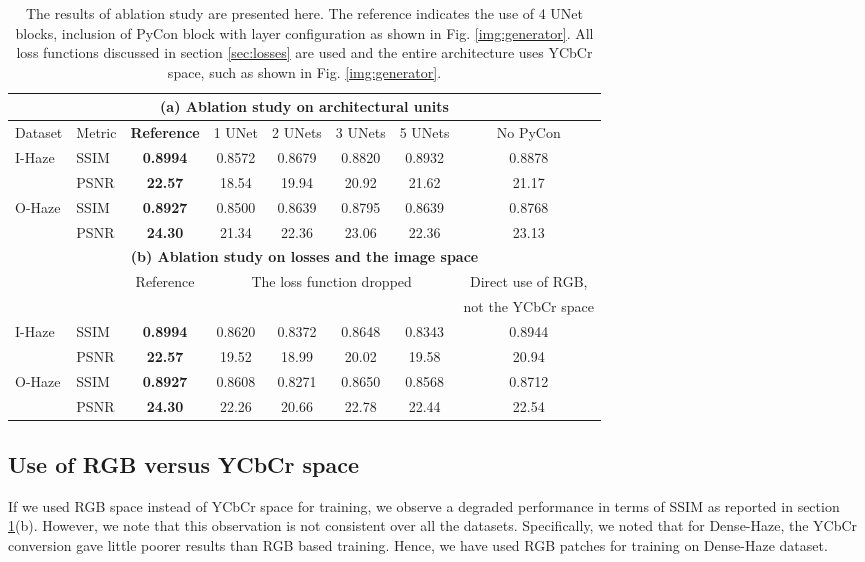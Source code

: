 \documentclass[runningheads]{llncs}
\begin{document}
\begin{table}[t]
\centering
\caption{The results of ablation study are presented here. The reference indicates the use of 4 UNet blocks, inclusion of PyCon block with layer configuration as shown in Fig. \ref{img:generator}. All loss functions discussed in section \ref{sec:losses} are used and the entire architecture uses YCbCr space, such as shown in Fig. \ref{img:generator}.}
\label{tab:abl1}
\begin{tabular}{|l|l||c|c|c|c|c|c|}
\hline
\multicolumn{8}{|c|}{\textbf{(a) Ablation study on architectural units}}\\
\hline
{Dataset}& {Metric}&\textbf{Reference}&{1 UNet}&{2 UNets}&{3 UNets}&{5 UNets} &{No PyCon}\\
\hline
\hline
I-Haze & SSIM & \textbf{0.8994} & 0.8572 & 0.8679 & 0.8820 & {0.8932} & {0.8878}\\
\cline{2-8}
& PSNR & \textbf{22.57} & 18.54 & 19.94 & 20.92 & {21.62} & 21.17 \\
\hline
O-Haze & SSIM & \textbf{0.8927} & 0.8500 & 0.8639 & 0.8795 & {0.8639} & {0.8768}\\
\cline{2-8}
& PSNR & \textbf{24.30} & 21.34 & 22.36 & 23.06 & {22.36} & 23.13 \\
\hline
\hline
\multicolumn{8}{|c|}{\textbf {(b) Ablation study on losses and the image space}}\\
\hline
{}&{}&{Reference}&\multicolumn{4}{|c||}{The loss function dropped} & Direct use of RGB,\\
\cline{4-7}
{}&{}&{}&{}&{}&{}&{} &{not the YCbCr space}\\
\hline
\hline
I-Haze & SSIM & \textbf{0.8994} & {0.8620} & {0.8372} & {0.8648} & {0.8343} & {0.8944}\\
\cline{2-8}
{} & PSNR & \textbf{22.57} & {19.52} & {18.99} & {20.02} & {19.58} & 20.94\\
\hline
O-Haze & SSIM & \textbf{0.8927} & {0.8608} & {0.8271} & {0.8650} & {0.8568} & {0.8712}\\
\cline{2-8}
{} & PSNR & \textbf{24.30} & {22.26} & {20.66} & {22.78} & {22.44} & 22.54\\
\hline
\end{tabular}
\end{table}

\subsection{Use of RGB versus YCbCr space} \label{sec:rgb_experiment}
If we used RGB space instead of YCbCr space for training, we observe a degraded performance in terms of SSIM as reported in section \ref{tab:abl1}(b). However, we note that this observation is not consistent over all the datasets. Specifically, we noted that for Dense-Haze, the YCbCr conversion gave little poorer results than RGB based training. Hence, we have used RGB patches for training on Dense-Haze dataset. 
\end{document}
